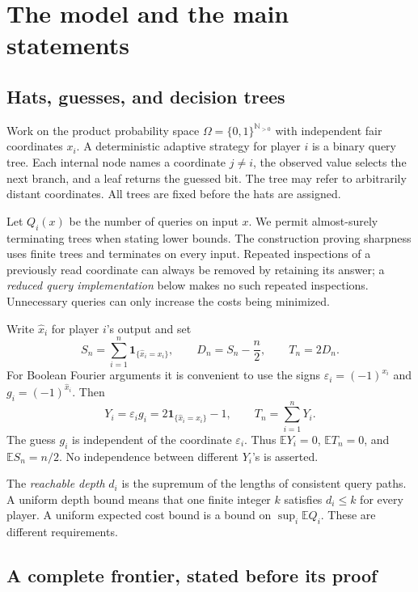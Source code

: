 \documentclass[11pt,letterpaper]{article}
\theoremstyle{definition}
\newcommand{\N}{\mathbb N}
\newcommand{\E}{\mathbb E}
\newcommand{\indic}[1]{\mathbf 1_{\{#1\}}}
\begin{document}
\section{The model and the main statements}
\label{mbg:insp:sec:model}

\subsection{Hats, guesses, and decision trees}

Work on the product probability space
\(\Omega=\{0,1\}^{\N_{>0}}\) with independent fair coordinates
\(x_i\). A deterministic adaptive strategy for player \(i\) is a binary
query tree. Each internal node names a coordinate \(j\ne i\), the
observed value selects the next branch, and a leaf returns the guessed
bit. The tree may refer to arbitrarily distant coordinates.
All trees are fixed before the hats are assigned.

Let \(Q_i(x)\) be the number of queries on input \(x\). We permit
almost-surely terminating trees when stating lower bounds. The
construction proving sharpness uses finite trees and terminates on
every input. Repeated inspections of a previously read coordinate
can always be removed by retaining its answer; a \emph{reduced query
implementation} below makes no such repeated inspections. Unnecessary
queries can only increase the costs being minimized.

Write \(\widehat x_i\) for player \(i\)'s output and set
\[
 S_n=\sum_{i=1}^n\indic{\widehat x_i=x_i},
 \qquad
 D_n=S_n-\frac n2,
 \qquad
 T_n=2D_n.
\]
For Boolean Fourier arguments it is convenient to use the signs
\(\varepsilon_i=(-1)^{x_i}\) and
\(g_i=(-1)^{\widehat x_i}\). Then
\[
 Y_i=\varepsilon_i g_i
 =2\indic{\widehat x_i=x_i}-1,
 \qquad
 T_n=\sum_{i=1}^nY_i.
\]
The guess \(g_i\) is independent of the coordinate \(\varepsilon_i\).
Thus \(\E Y_i=0\), \(\E T_n=0\), and \(\E S_n=n/2\).
No independence between different \(Y_i\)'s is asserted.

The \emph{reachable depth} \(d_i\) is the supremum of the lengths of
consistent query paths. A uniform depth bound means that one finite
integer \(k\) satisfies \(d_i\le k\) for every player. A uniform expected
cost bound is a bound on \(\sup_i\E Q_i\). These are different
requirements.

\subsection{A complete frontier, stated before its proof}
\end{document}
